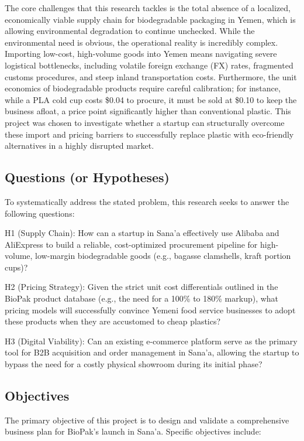 \documentclass[12pt,a4paper]{article}
\begin{document}
The core challenges that this research tackles is the total absence of a localized, economically viable supply chain for biodegradable packaging in Yemen, which is allowing environmental degradation to continue unchecked. While the environmental need is obvious, the operational reality is incredibly complex. Importing low-cost, high-volume goods into Yemen means navigating severe logistical bottlenecks, including volatile foreign exchange (FX) rates, fragmented customs procedures, and steep inland transportation costs. Furthermore, the unit economics of biodegradable products require careful calibration; for instance, while a PLA cold cup costs \$0.04 to procure, it must be sold at \$0.10 to keep the business afloat, a price point significantly higher than conventional plastic. This project was chosen to investigate whether a startup can structurally overcome these import and pricing barriers to successfully replace plastic with eco-friendly alternatives in a highly disrupted market.

\subsection{Questions (or Hypotheses)}

To systematically address the stated problem, this research seeks to answer the following questions:

H1 (Supply Chain): How can a startup in Sana'a effectively use Alibaba and AliExpress to build a reliable, cost-optimized procurement pipeline for high-volume, low-margin biodegradable goods (e.g., bagasse clamshells, kraft portion cups)?

H2 (Pricing Strategy): Given the strict unit cost differentials outlined in the BioPak product database (e.g., the need for a 100\% to 180\% markup), what pricing models will successfully convince Yemeni food service businesses to adopt these products when they are accustomed to cheap plastics?

H3 (Digital Viability): Can an existing e-commerce platform serve as the primary tool for B2B acquisition and order management in Sana'a, allowing the startup to bypass the need for a costly physical showroom during its initial phase?

\subsection{Objectives}

The primary objective of this project is to design and validate a comprehensive business plan for BioPak's launch in Sana'a. Specific objectives include:
\end{document}
